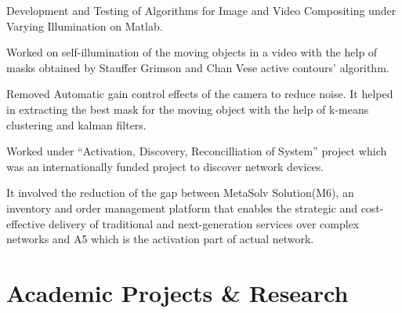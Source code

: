 \documentclass[letterpaper]{deedy-resume} %
\begin{document}
\begin{minipage}[t]{0.76\textwidth} %


\begin{tightitemize}
\item Development and Testing of Algorithms for Image and Video Compositing under Varying Illumination on Matlab.
\item Worked on self-illumination of the moving objects in a video with the help of masks obtained by Stauffer Grimson and Chan Vese active contours’ algorithm.
\item Removed Automatic gain control effects of the camera to reduce noise. It helped in extracting the best mask for the moving object with the help of k-means clustering and kalman filters.
\end{tightitemize}



\begin{tightitemize}
\item Worked under “Activation, Discovery, Reconcilliation of System” project which was an internationally funded project to discover network devices.
\item It involved the reduction of the gap between MetaSolv Solution(M6), an inventory and order management platform that enables the strategic and cost-effective delivery of traditional and next-generation services over complex networks and A5 which is the activation part of actual network.
\end{tightitemize}
\vspace{-5 mm}
\hfill

\section{Academic Projects \& Research}


\end{minipage}
\end{document}
